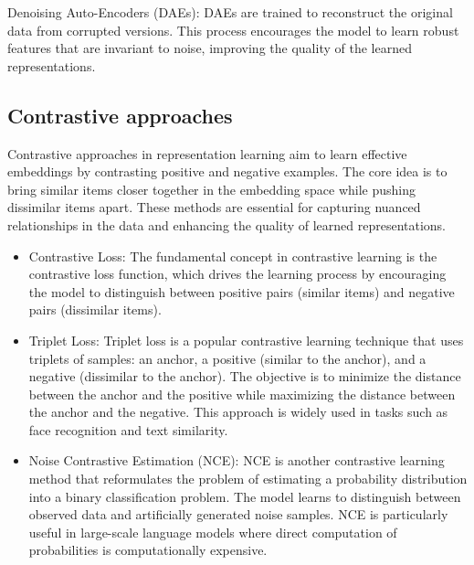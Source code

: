 Denoising Auto-Encoders (DAEs): DAEs are trained to reconstruct the original data from corrupted versions. This process encourages the model to learn robust features that are invariant to noise, improving the quality of the learned representations.

\subsection{Contrastive approaches}

Contrastive approaches in representation learning aim to learn effective embeddings by contrasting positive and negative examples. The core idea is to bring similar items closer together in the embedding space while pushing dissimilar items apart. These methods are essential for capturing nuanced relationships in the data and enhancing the quality of learned representations.
\begin{itemize}
  \item Contrastive Loss: The fundamental concept in contrastive learning is the contrastive loss function, which drives the learning process by encouraging the model to distinguish between positive pairs (similar items) and negative pairs (dissimilar items).
  \item Triplet Loss: Triplet loss is a popular contrastive learning technique that uses triplets of samples: an anchor, a positive (similar to the anchor), and a negative (dissimilar to the anchor). The objective is to minimize the distance between the anchor and the positive while maximizing the distance between the anchor and the negative. This approach is widely used in tasks such as face recognition and text similarity.
  \item 
  Noise Contrastive Estimation (NCE): NCE is another contrastive learning method that reformulates the problem of estimating a probability distribution into a binary classification problem. The model learns to distinguish between observed data and artificially generated noise samples. NCE is particularly useful in large-scale language models where direct computation of probabilities is computationally expensive.
\end{itemize}